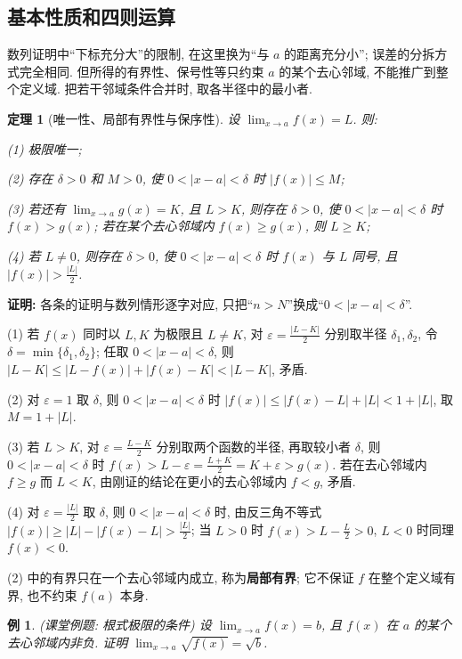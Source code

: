 \documentclass[UTF8,openany]{ctexbook}
\theoremstyle{chinesetextbook}
\newtheorem{example}{例}[section]
\newtheorem{theorem}{定理}[section]
\newenvironment{cnproof}{\par\indent\textbf{证明:} \ignorespaces}{\par}
\begin{document}
\subsection{基本性质和四则运算}
数列证明中“下标充分大”的限制, 在这里换为“与 $a$ 的距离充分小”; 误差的分拆方式完全相同. 但所得的有界性、保号性等只约束 $a$ 的某个去心邻域, 不能推广到整个定义域. 把若干邻域条件合并时, 取各半径中的最小者.
\begin{theorem}[唯一性、局部有界性与保序性]
设 $\displaystyle \lim_{x\to a}f(x)=L$. 则:

(1) 极限唯一;

(2) 存在 $\delta>0$ 和 $M>0$, 使 $0<|x-a|<\delta$ 时 $|f(x)|\le M$;

(3) 若还有 $\displaystyle\lim_{x\to a}g(x)=K$, 且 $L>K$, 则存在 $\delta>0$, 使 $0<|x-a|<\delta$ 时 $f(x)>g(x)$; 若在某个去心邻域内 $f(x)\ge g(x)$, 则 $L\ge K$;

(4) 若 $L\ne0$, 则存在 $\delta>0$, 使 $0<|x-a|<\delta$ 时 $f(x)$ 与 $L$ 同号, 且 $\displaystyle|f(x)|>\frac{|L|}2$.
\end{theorem}
\begin{cnproof}
各条的证明与数列情形逐字对应, 只把“$n>N$”换成“$0<|x-a|<\delta$”.

(1) 若 $f(x)$ 同时以 $L,K$ 为极限且 $L\ne K$, 对 $\displaystyle\varepsilon=\frac{|L-K|}2$ 分别取半径 $\delta_1,\delta_2$, 令 $\delta=\min\{\delta_1,\delta_2\}$; 任取 $0<|x-a|<\delta$, 则 $|L-K|\le|L-f(x)|+|f(x)-K|<|L-K|$, 矛盾.

(2) 对 $\varepsilon=1$ 取 $\delta$, 则 $0<|x-a|<\delta$ 时 $|f(x)|\le|f(x)-L|+|L|<1+|L|$, 取 $M=1+|L|$.

(3) 若 $L>K$, 对 $\displaystyle\varepsilon=\frac{L-K}2$ 分别取两个函数的半径, 再取较小者 $\delta$, 则 $0<|x-a|<\delta$ 时 $\displaystyle f(x)>L-\varepsilon=\frac{L+K}2=K+\varepsilon>g(x)$. 若在去心邻域内 $f\ge g$ 而 $L<K$, 由刚证的结论在更小的去心邻域内 $f<g$, 矛盾.

(4) 对 $\displaystyle\varepsilon=\frac{|L|}2$ 取 $\delta$, 则 $0<|x-a|<\delta$ 时, 由反三角不等式 $\displaystyle|f(x)|\ge|L|-|f(x)-L|>\frac{|L|}2$; 当 $L>0$ 时 $\displaystyle f(x)>L-\frac L2>0$, $L<0$ 时同理 $f(x)<0$.
\end{cnproof}
(2) 中的有界只在一个去心邻域内成立, 称为\textbf{局部有界}; 它不保证 $f$ 在整个定义域有界, 也不约束 $f(a)$ 本身.
\begin{example}
\textnormal{(课堂例题: 根式极限的条件)} 设 $\displaystyle\lim_{x\to a}f(x)=b$, 且 $f(x)$ 在 $a$ 的某个去心邻域内非负. 证明 $\displaystyle\lim_{x\to a}\sqrt{f(x)}=\sqrt b$.
\end{example}
\end{document}
